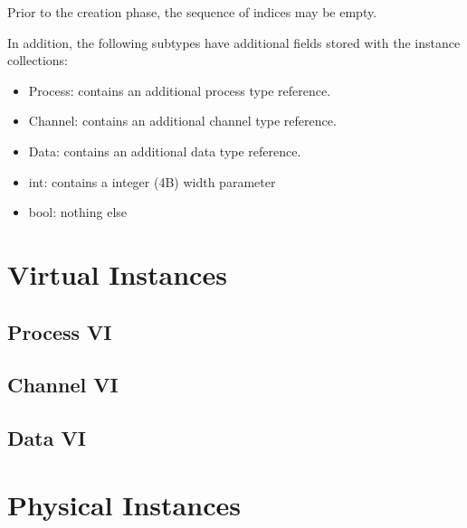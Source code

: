Prior to the creation phase, the sequence of indices may be empty.  

In addition, the following subtypes have additional fields stored with 
the instance collections:

\begin{itemize}
\item Process: contains an additional process type reference.  
\item Channel: contains an additional channel type reference.  
\item Data: contains an additional data type reference.  
\item int: contains a integer (4B) width parameter
\item bool: nothing else
\end{itemize}

\section{Virtual Instances}
\label{sec:instance:virtual}

\subsection{Process VI}
\label{sec:instance:virtual:proc}

\subsection{Channel VI}
\label{sec:instance:virtual:chan}

\subsection{Data VI}
\label{sec:instance:virtual:data}

\section{Physical Instances}
\label{sec:instance:physical}

